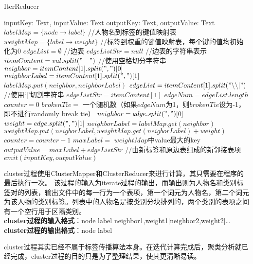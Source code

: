 \begin{algorithm}[H]
    \caption{IterReducer}
    \begin{algorithmic}[1]
        \REQUIRE inputKey: Text, inputValue: Text
        \ENSURE outputKey: Text, outputValue: Text
        \STATE $labelMap = \{node \rightarrow label\}$ //人物名到标签的键值映射表
        \STATE $weightMap = \{label \rightarrow weight\}$ //标签到权重的键值映射表，每个键的值均初始化为0
        \STATE $edgeList = \emptyset$ //边表
        \STATE $edgeListStr = null$ //边表的字符串表示
        \STATE
        \STATE $itemContent = val.split("\quad")$ //使用空格切分字符串
        \STATE $neighbor = itemContent[1].split(",")[0]$
        \STATE $neighborLabel = itemContent[1].split(",")[1]$
        \STATE $labelMap.put(neighbor, neighborLabel)$
        \STATE $edgeList = itemContent[1].split("\backslash\backslash|")$ //使用‘|’切割字符串
        \STATE $edgeListStr = itemContent[1]$
        \ENDIF
        \STATE
        \STATE $edgeNum = edgeList.length$
        \STATE $counter = 0$
        \STATE $brokenTie =$ 一个随机数（如果$edgeNum$为1，则$brokenTie$设为-1，即不进行randomly break tie）
        \STATE $neighbor = edge.split(",")[0]$
        \STATE $weight = edge.split(",")[1]$
        \STATE $neighborLabel = labelMap.get(neighbor)$
        \STATE $weightMap.put(neigborLabel, weightMap.get(neigborLabel) + weight)$
        \ENDIF
        \STATE $counter = counter + 1$
        \ENDFOR
        \STATE
        \STATE $maxLabel =$ $weightMap$中value最大的key
        \STATE $outputValue = maxLabel + edgeListStr$ //由新标签和原边表组成的新邻接表项
        \STATE $emit(inputKey, outputValue)$
        \ENDFOR
    \end{algorithmic}
\end{algorithm}
cluster过程使用ClusterMapper和ClusterReducer来进行计算，其只需要在程序的最后执行一次。
该过程的输入为iterate过程的输出，而输出则为人物名和类别标签对的列表，输出文件中的每一行为一个表项，第一个词元为人物名，第二个词元为该人物的类别标签。列表中的人物名是按类别分块排列的，两个类别的表项之间有一个空行用于区隔类别。
\\ \textbf{cluster过程的输入格式}：node  label neighbor1,weight1|neighbor2,weight2|\dots
\\ \textbf{cluster过程的输出格式}：node  label
\par
cluster过程其实已经不属于标签传播算法本身。在迭代计算完成后，聚类分析就已经完成，cluster过程的目的只是为了整理结果，使其更清晰易读。
